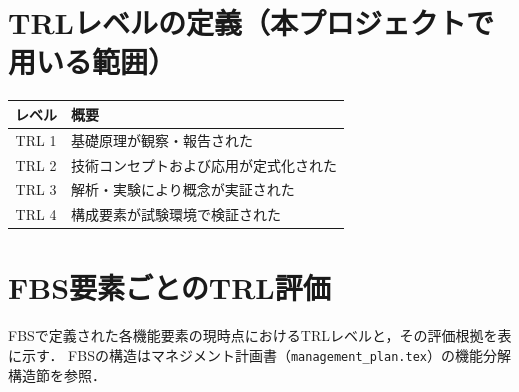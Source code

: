 
\section{TRLレベルの定義（本プロジェクトで用いる範囲）}

\begin{table}[H]
  \centering
  \begin{tabularx}{\linewidth}{cX}
    \toprule
    レベル & 概要 \\
    \midrule
    TRL 1 & 基礎原理が観察・報告された \\
    TRL 2 & 技術コンセプトおよび応用が定式化された \\
    TRL 3 & 解析・実験により概念が実証された \\
    TRL 4 & 構成要素が試験環境で検証された \\
    \bottomrule
  \end{tabularx}
\end{table}

\section{FBS要素ごとのTRL評価}

FBSで定義された各機能要素の現時点におけるTRLレベルと，その評価根拠を表に示す．
FBSの構造はマネジメント計画書（\texttt{management\_plan.tex}）の機能分解構造節を参照．

